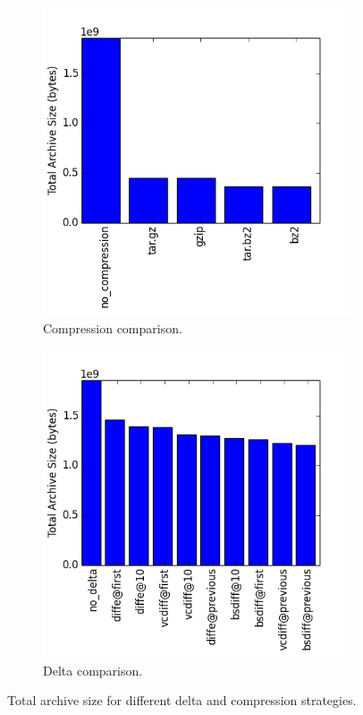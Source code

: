 \documentclass[11pt]{article}
\begin{document}
    \begin{figure}
    \centering
    \begin{subfigure}{.5\textwidth}
      \centering
      \includegraphics[width=\linewidth]{images/tas_compression.png}
      \caption{Compression comparison.}
    \end{subfigure}%
    \begin{subfigure}{.5\textwidth}
      \centering
      \includegraphics[width=\linewidth]{images/tas_delta.png}
      \caption{Delta comparison.}
      \label{fig:tas_delta_compression:b}
    \end{subfigure}
    \caption{Total archive size for different delta and compression strategies.}
    \label{fig:tas_delta_compression}
    \end{figure}
\end{document}
